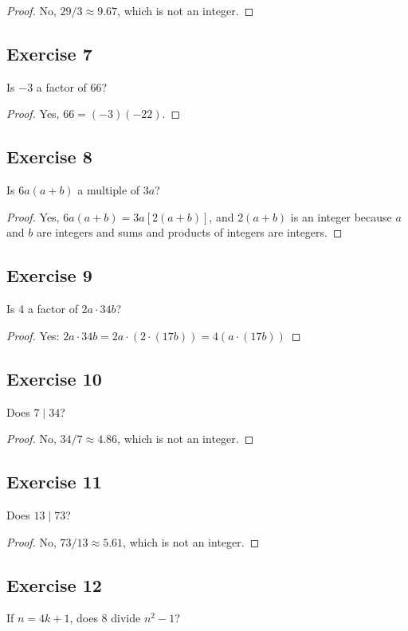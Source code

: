 \documentclass[14pt]{extarticle}
\begin{document}
\begin{proof}
    No, $29/3 \approx 9.67$, which is not an integer.
\end{proof}

\subsection{Exercise 7}
Is $-3$ a factor of 66?

\begin{proof}
    Yes, $66 = (-3)(-22)$.
\end{proof}

\subsection{Exercise 8}
Is $6a(a + b)$ a multiple of $3a$?

\begin{proof}
    Yes, $6a(a + b) = 3a[2(a + b)]$, and $2(a + b)$ is an integer because $a$ and $b$ are integers and sums and products of integers are integers.
\end{proof}

\subsection{Exercise 9}
Is 4 a factor of $2a\cdot 34b$?

\begin{proof}
    Yes: $2a\cdot 34b = 2a \cdot (2\cdot(17b)) = 4(a\cdot(17b))$
\end{proof}

\subsection{Exercise 10}
Does $7 \mid 34$?

\begin{proof}
    No, $34/7 \approx 4.86$, which is not an integer.
\end{proof}

\subsection{Exercise 11}
Does $13 \mid 73$?

\begin{proof}
    No, $73/13 \approx 5.61$, which is not an integer.
\end{proof}

\subsection{Exercise 12}
If $n = 4k + 1$, does 8 divide $n^2 - 1$?
\end{document}
